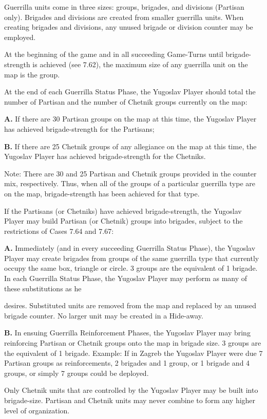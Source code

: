 Guerrilla units come in three sizes: groups, brigades, and divisions (Partisan only). Brigades and divisions are created from smaller guerrilla units. When creating brigades and divisions, any unused brigade or division counter may be employed.

 At the beginning of the game and in all succeeding Game-Turns until brigade-strength is achieved (see 7.62), the maximum size of any guerrilla unit on the map is the group.

 At the end of each Guerrilla Status Phase, the Yugoslav Player should total the number of Partisan and the number of Chetnik groups currently on the map:

\textbf{A.} If there are 30 Partisan groups on the map at this time, the Yugoslav Player has achieved brigade-strength for the Partisans;

\textbf{B.} If there are 25 Chetnik groups of any allegiance on the map at this time, the Yugoslav Player has achieved brigade-strength for the Chetniks.

Note: There are 30 and 25 Partisan and Chetnik groups provided in the counter mix, respectively. Thus, when all of the groups of a particular guerrilla type are on the map, brigade-strength has been achieved for that type.

 If the Partisans (or Chetniks) have achieved brigade-strength, the Yugoslav Player may build Partisan (or Chetnik) groups into brigades, subject to the restrictions of Cases 7.64 and 7.67:

\textbf{A.} Immediately (and in every succeeding Guerrilla Status Phase), the Yugoslav Player may create brigades from groups of the same guerrilla type that currently occupy the same box, triangle or circle. 3 groups are the equivalent of 1 brigade. In each Guerrilla Status Phase, the Yugoslav Player may perform as many of these substitutions as he

desires. Substituted units are removed from the map and replaced by an unused brigade counter. No larger unit may be created in a Hide-away.

\textbf{B.} In ensuing Guerrilla Reinforcement Phases, the Yugoslav Player may bring reinforcing Partisan or Chetnik groups onto the map in brigade size. 3 groups are the equivalent of 1 brigade. Example: If in Zagreb the Yugoslav Player were due 7 Partisan groups as reinforcements, 2 brigades and 1 group, or 1 brigade and 4 groups, or simply 7 groups could be deployed.

 Only Chetnik units that are controlled by the Yugoslav Player may be built into brigade-size. Partisan and Chetnik units may never combine to form any higher level of organization.

